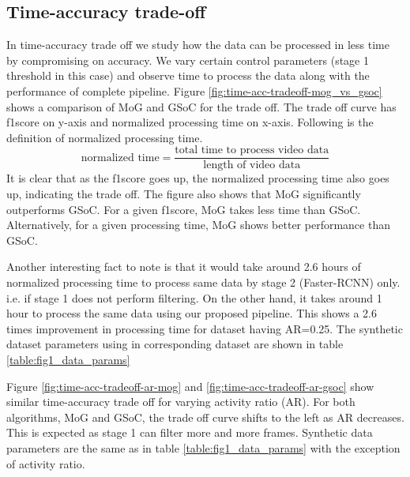 \subsection{Time-accuracy trade-off}
In time-accuracy trade off we study how the data can be processed in less time by compromising on accuracy. We vary certain control parameters (stage 1 threshold in this case) and observe time to process the data along with the performance of complete pipeline. Figure \ref{fig:time-acc-tradeoff-mog_vs_gsoc} shows a comparison of MoG and GSoC for the trade off. The trade off curve has f1score on y-axis and normalized processing time on x-axis. Following is the definition of normalized processing time. 
$$\text{normalized time} = \frac{\text{total time to process video data}}{\text{length of video data}}$$
It is clear that as the f1score goes up, the normalized processing time also goes up, indicating the trade off. The figure also shows that MoG significantly outperforms GSoC. For a given f1score, MoG takes less time than GSoC. Alternatively, for a given processing time, MoG shows better performance than GSoC. 

Another interesting fact to note is that it would take around 2.6 hours of normalized processing time to process same data by stage 2 (Faster-RCNN) only. i.e. if stage 1 does not perform filtering. On the other hand, it takes around 1 hour to process the same data using our proposed pipeline.  This shows a 2.6 times improvement in processing time for dataset having AR=0.25. The synthetic dataset parameters using in corresponding dataset are shown in table \ref{table:fig1_data_params}

Figure \ref{fig:time-acc-tradeoff-ar-mog} and \ref{fig:time-acc-tradeoff-ar-gsoc} show similar time-accuracy  trade off for varying activity ratio (AR). For both algorithms, MoG and GSoC, the trade off curve shifts to the left as AR decreases. This is expected as stage 1 can filter more and more frames. Synthetic data parameters are the same as in table \ref{table:fig1_data_params} with the exception of activity ratio. 

